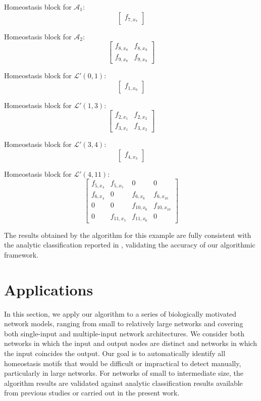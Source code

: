 \documentclass[pdflatex,sn-basic,Numbered]{sn-jnl}
\renewcommand{\AA}{{\mathcal A}}
\theoremstyle{thmstyleone}%
\numberwithin{equation}{section}
\begin{document}
\begin{tcolorbox}[colframe=blue!80!black, colback=white, fontupper=\color{blue}\ttfamily]
Homeostasis block for $\AA_1$:
\[
\begin{bmatrix}
f_{7,x_7}
\end{bmatrix}
\]

Homeostasis block for $\AA_2$:
\[
\begin{bmatrix}
f_{8,x_8} & f_{8,x_9} \\
f_{9,x_8} & f_{9,x_9}
\end{bmatrix}
\]

Homeostasis block for $\mathcal{L}'(0,1)$:
\[
\begin{bmatrix}
f_{1,x_0}
\end{bmatrix}
\]

Homeostasis block for $\mathcal{L}'(1,3)$:
\[
\begin{bmatrix}
f_{2,x_1} & f_{2,x_2} \\
f_{3,x_1} & f_{3,x_2}
\end{bmatrix}
\]

Homeostasis block for $\mathcal{L}'(3,4)$:
\[
\begin{bmatrix}
f_{4,x_3}
\end{bmatrix}
\]

Homeostasis block for $\mathcal{L}'(4,11)$:
\[
\begin{bmatrix}
f_{5,x_4}  & f_{5,x_5}  & 0         & 0 \\
f_{6,x_4}  & 0          & f_{6,x_6}  & f_{6,x_{10}} \\
0          & 0          & f_{10,x_6} & f_{10,x_{10}} \\
0          & f_{11,x_5} & f_{11,x_6} & 0
\end{bmatrix}
\]

\end{tcolorbox}




The results obtained by the algorithm for this example are fully consistent with the analytic classification reported in \cite{WHAG21}, validating the accuracy of our algorithmic framework.

\section{Applications}\label{sec:application}

In this section, we apply our algorithm to a series of biologically motivated network models, ranging from small to relatively large networks and covering both single-input and multiple-input network architectures. We consider both networks in which the input and output nodes are distinct and networks in which the input coincides the output. Our goal is to automatically identify all homeostasis motifs that would be difficult or impractical to detect manually, particularly in large networks. For networks of small to intermediate size, the algorithm results are validated against analytic classification results available from previous studies or carried out in the present work. 
\end{document}
